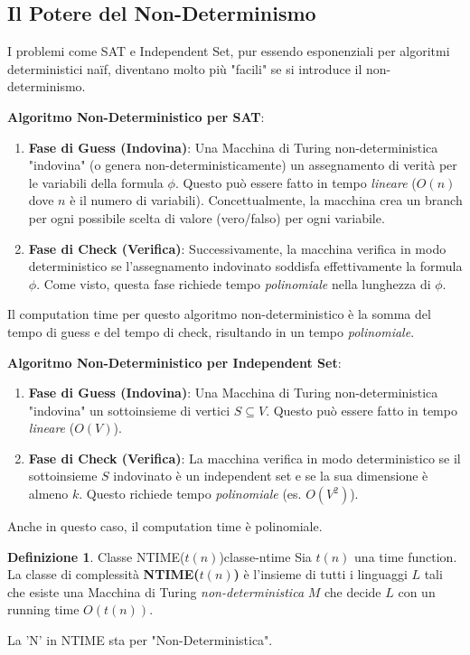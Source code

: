 \documentclass[a4paper]{article}
\theoremstyle{definition} %
\newtheorem{definition}{Definizione}[section]
\begin{document}
\subsection{Il Potere del Non-Determinismo}
I problemi come SAT e Independent Set, pur essendo esponenziali per algoritmi deterministici naïf, diventano molto più "facili" se si introduce il non-determinismo.

\textbf{Algoritmo Non-Deterministico per SAT}:
\begin{enumerate}
    \item \textbf{Fase di Guess (Indovina)}: Una Macchina di Turing non-deterministica "indovina" (o genera non-deterministicamente) un assegnamento di verità per le variabili della formula $\phi$. Questo può essere fatto in tempo \emph{lineare} ($O(n)$ dove $n$ è il numero di variabili). Concettualmente, la macchina crea un branch per ogni possibile scelta di valore (vero/falso) per ogni variabile.
    \item \textbf{Fase di Check (Verifica)}: Successivamente, la macchina verifica in modo deterministico se l'assegnamento indovinato soddisfa effettivamente la formula $\phi$. Come visto, questa fase richiede tempo \emph{polinomiale} nella lunghezza di $\phi$.
\end{enumerate}
Il computation time per questo algoritmo non-deterministico è la somma del tempo di guess e del tempo di check, risultando in un tempo \emph{polinomiale}.

\textbf{Algoritmo Non-Deterministico per Independent Set}:
\begin{enumerate}
    \item \textbf{Fase di Guess (Indovina)}: Una Macchina di Turing non-deterministica "indovina" un sottoinsieme di vertici $S \subseteq V$. Questo può essere fatto in tempo \emph{lineare} ($O(V)$).
    \item \textbf{Fase di Check (Verifica)}: La macchina verifica in modo deterministico se il sottoinsieme $S$ indovinato è un independent set e se la sua dimensione è almeno $k$. Questo richiede tempo \emph{polinomiale} (es. $O(V^2)$).
\end{enumerate}
Anche in questo caso, il computation time è polinomiale.

\begin{definition}{Classe NTIME($t(n)$)}{classe-ntime}
Sia $t(n)$ una time function. La classe di complessità \textbf{NTIME($t(n)$)} è l'insieme di tutti i linguaggi $L$ tali che esiste una Macchina di Turing \emph{non-deterministica} $M$ che decide $L$ con un running time $O(t(n))$.
\end{definition}
La 'N' in NTIME sta per "Non-Deterministica".
\end{document}
